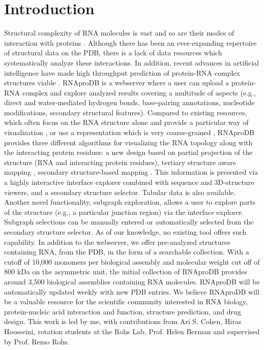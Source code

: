 \section{Introduction}
Structural complexity of RNA molecules is vast and so are their modes of interaction with proteins \citep{jones2001protein}. Although there has been an ever-expanding repertoire of structural data on the PDB, there is a lack of data resources which systematically analyze these interactions. In addition, recent advances in artificial intelligence have made high throughput prediction of protein-RNA complex structures viable \citep{Abramson2024, watson2023novo}. RNAproDB is a webserver where a user can upload a protein-RNA complex and explore analyzed results covering a multitude of aspects (e.g., direct and water-mediated hydrogen bonds, base-pairing annotations, nucleotide modifications, secondary structural features). Compared to existing resources, which often focus on the RNA structure alone and provide a particular way of visualization \citep{Kerpedjiev2015, Yang2003}, or use a representation which is very coarse-grained \citep{chojnowski2014rna}, RNAproDB provides three different algorithms for visualizing the RNA topology along with the interacting protein residues: a new design based on partial projection of the structure (RNA and interacting protein residues), tertiary structure aware mapping \citep{Mitra2024rnascape}, secondary structure-based mapping \citep{Kerpedjiev2015}. This information is presented via a highly interactive interface explorer combined with sequence and 3D-structure viewers, and a secondary structure selector. Tabular data is also available. Another novel functionality, subgraph exploration, allows a user to explore parts of the structure (e.g., a particular junction region) via the interface explorer. Subgraph selections can be manually entered or automatically selected from the secondary structure selector. As of our knowledge, no existing tool offers such capability. In addition to the webserver, we offer pre-analyzed structures containing RNA, from the PDB, in the form of a searchable collection. With a cutoff of 10,000 monomers per biological assembly and molecular weight cut off of 800 kDa on the asymmetric unit, the initial collection of RNAproDB provides around 3,500 biological assemblies containing RNA molecules. RNAproDB will be automatically updated weekly with new PDB entries. We believe RNAproDB will be a valuable resource for the scientific community interested in RNA biology, protein-nucleic acid interaction and function, structure prediction, and drug design. This work is led by me, with contributions from Ari S. Cohen, Hiras Hoosseini, rotation students at the Rohs Lab, Prof. Helen Berman and supervised by Prof. Remo Rohs.

